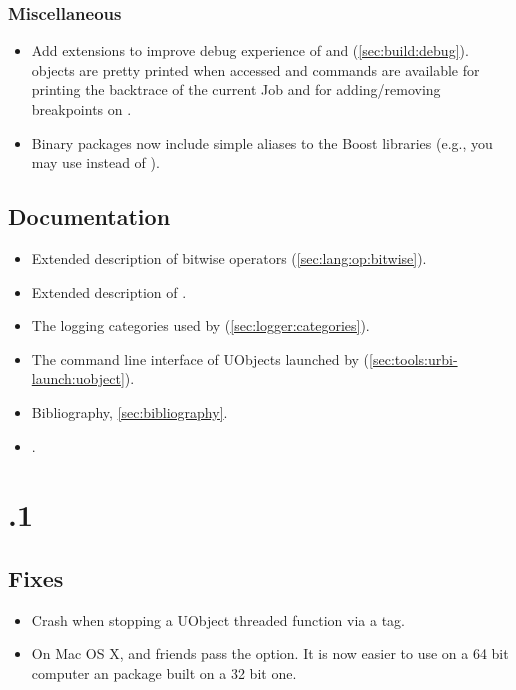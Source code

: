 \subsubsection{Miscellaneous}
\begin{itemize}
\item Add  extensions to improve debug experience of \urbi and
  \us (\autoref{sec:build:debug}).  \urbi objects are pretty printed when
  accessed and commands are available for printing the backtrace of the
  current Job and for adding/removing breakpoints on \us.

\item Binary packages now include simple aliases to the Boost libraries
  (e.g., you may use  instead of
  ).
\end{itemize}


\subsection{Documentation}
\begin{itemize}
\item Extended description of bitwise operators
  (\autoref{sec:lang:op:bitwise}).
\item Extended description of .
\item The logging categories used by \usdk
  (\autoref{sec:logger:categories}).
\item The command line interface of UObjects launched by
   (\autoref{sec:tools:urbi-launch:uobject}).
\item Bibliography, \autoref{sec:bibliography}.
\item {}.
\end{itemize}



\section{.1}

\subsection{Fixes}
\begin{itemize}
\item Crash when stopping a UObject threaded function via a tag.
\item On Mac OS X,  and friends pass the  option.
  It is now easier to use on a 64 bit computer an \usdk package built on a
  32 bit one.
\end{itemize}

